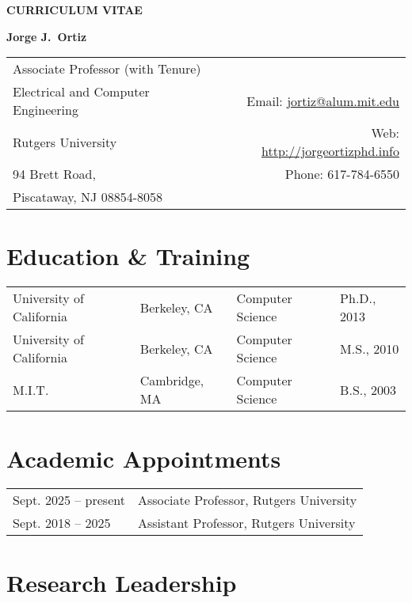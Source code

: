 \documentclass[12pt]{article}
\begin{document}
\pagestyle{CVfooter}

\noindent \textbf{\uppercase{curriculum vitae}}
\vspace{2mm}

\noindent \textbf{Jorge J.\ Ortiz}
\vspace{1mm}

\noindent\begin{tabular*}{\textwidth}{@{\extracolsep{\fill}}l r}
Associate Professor (with Tenure)\\ Electrical and Computer Engineering & Email: \href{mailto:jortiz@alum.mit.edu}{jortiz@alum.mit.edu} \\
Rutgers University & Web: \href{http://jorgeortizphd.info}{http://jorgeortizphd.info} \\
94 Brett Road, & Phone: 617-784-6550 \\
Piscataway, NJ 08854-8058 &  \\
\hline
\end{tabular*}



\section{Education \& Training}

\begin{tabular}{l l l l}
University of California & Berkeley, CA & Computer Science & Ph.D., 2013 \\
University of California & Berkeley, CA & Computer Science & M.S., 2010 \\
M.I.T. & Cambridge, MA & Computer Science & B.S., 2003 \\
\end{tabular}



\section{Academic Appointments}

\begin{tabular}{l l}
Sept. 2025 -- present & Associate Professor, Rutgers University \\
Sept. 2018 -- 2025 & Assistant Professor, Rutgers University \\
\end{tabular}

\section{Research Leadership}
\end{document}
